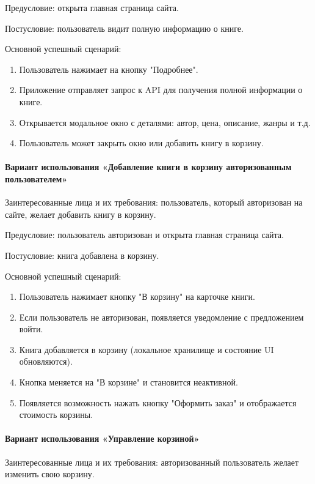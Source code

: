 Предусловие: открыта главная страница сайта.

Постусловие: пользователь видит полную информацию о книге.

Основной успешный сценарий:

\begin{enumerate}
	\item Пользователь нажимает на кнопку "Подробнее".
	\item Приложение отправляет запрос к API для получения полной информации о книге.
	\item Открывается модальное окно с деталями: автор, цена, описание, жанры и т.д.
	\item Пользователь может закрыть окно или добавить книгу в корзину.
\end{enumerate}


\paragraph{Вариант использования «Добавление книги в корзину авторизованным пользователем»}

Заинтересованные лица и их требования: пользователь, который авторизован на сайте, желает добавить книгу в корзину.

Предусловие: пользователь авторизован и открыта главная страница сайта.

Постусловие: книга добавлена в корзину.

Основной успешный сценарий:

\begin{enumerate}
	\item Пользователь нажимает кнопку "В корзину" на карточке книги.
	\item Если пользователь не авторизован, появляется уведомление с предложением войти.
	\item Книга добавляется в корзину (локальное хранилище и состояние UI обновляются).
	\item Кнопка меняется на "В корзине" и становится неактивной.
	\item Появляется возможность нажать кнопку "Оформить заказ"
	и отображается стоимость корзины.
\end{enumerate}

\paragraph{Вариант использования «Управление корзиной»}

Заинтересованные лица и их требования: авторизованный пользователь желает изменить свою корзину.


